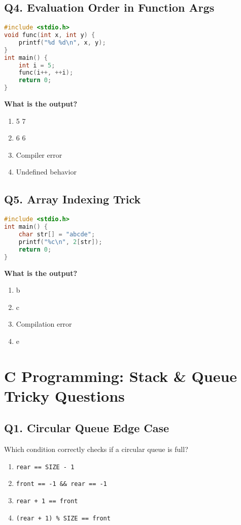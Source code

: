 \vspace{1em}
\subsection*{Q4. Evaluation Order in Function Args}
\noindent
\begin{lstlisting}[language=C]
#include <stdio.h>
void func(int x, int y) {
    printf("%d %d\n", x, y);
}
int main() {
    int i = 5;
    func(i++, ++i);
    return 0;
}
\end{lstlisting}
\textbf{What is the output?}
\begin{enumerate}[label=(\alph*)]
    \item 5 7
    \item 6 6
    \item Compiler error
    \item Undefined behavior
\end{enumerate}

\vspace{1em}
\subsection*{Q5. Array Indexing Trick}
\noindent
\begin{lstlisting}[language=C]
#include <stdio.h>
int main() {
    char str[] = "abcde";
    printf("%c\n", 2[str]);
    return 0;
}
\end{lstlisting}
\textbf{What is the output?}
\begin{enumerate}[label=(\alph*)]
    \item b
    \item c
    \item Compilation error
    \item e
\end{enumerate}
\section{C Programming: Stack \& Queue Tricky Questions}

\subsection*{Q1. Circular Queue Edge Case}
Which condition correctly checks if a circular queue is full?

\begin{enumerate}[label=(\alph*)]
    \item \texttt{rear == SIZE - 1}
    \item \texttt{front == -1 \&\& rear == -1}
    \item \texttt{rear + 1 == front}
    \item \texttt{(rear + 1) \% SIZE == front}
\end{enumerate}

